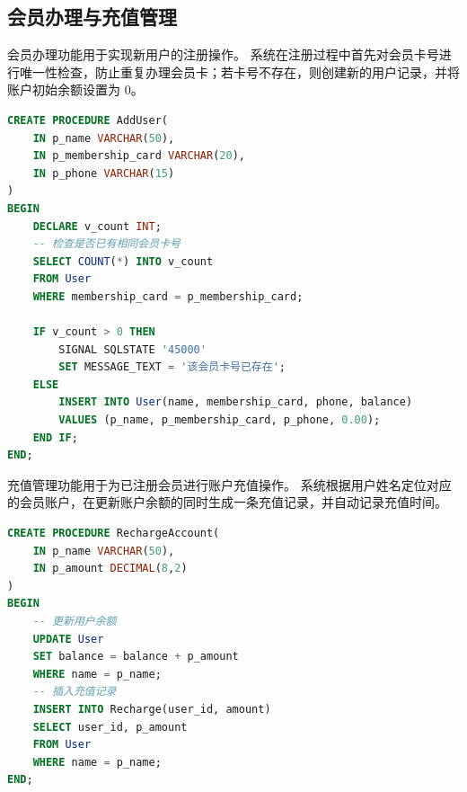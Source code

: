\documentclass[12pt,a4paper]{article}
\begin{document}
\subsection{会员办理与充值管理}
会员办理功能用于实现新用户的注册操作。
系统在注册过程中首先对会员卡号进行唯一性检查，防止重复办理会员卡；若卡号不存在，则创建新的用户记录，并将账户初始余额设置为 0。
\begin{lstlisting}[language=SQL,caption={会员办理功能}]
CREATE PROCEDURE AddUser(
    IN p_name VARCHAR(50),
    IN p_membership_card VARCHAR(20),
    IN p_phone VARCHAR(15)
)
BEGIN
    DECLARE v_count INT;
    -- 检查是否已有相同会员卡号
    SELECT COUNT(*) INTO v_count
    FROM User
    WHERE membership_card = p_membership_card;

    IF v_count > 0 THEN
        SIGNAL SQLSTATE '45000'
        SET MESSAGE_TEXT = '该会员卡号已存在';
    ELSE
        INSERT INTO User(name, membership_card, phone, balance)
        VALUES (p_name, p_membership_card, p_phone, 0.00);
    END IF;
END;
\end{lstlisting}

充值管理功能用于为已注册会员进行账户充值操作。
系统根据用户姓名定位对应的会员账户，在更新账户余额的同时生成一条充值记录，并自动记录充值时间。
\begin{lstlisting}[language=SQL,caption={账户充值功能}]
CREATE PROCEDURE RechargeAccount(
    IN p_name VARCHAR(50),
    IN p_amount DECIMAL(8,2)
)
BEGIN
    -- 更新用户余额
    UPDATE User
    SET balance = balance + p_amount
    WHERE name = p_name;
    -- 插入充值记录
    INSERT INTO Recharge(user_id, amount)
    SELECT user_id, p_amount
    FROM User
    WHERE name = p_name;
END;
\end{lstlisting}
\end{document}
